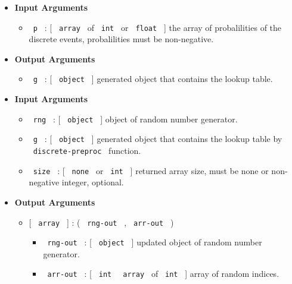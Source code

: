 \begin{itemize}
\item
  \textbf{Input Arguments}

  \begin{itemize}
  \tightlist
  \item
    \texttt{\ p\ } : {[} \texttt{\ array\ } of \texttt{\ int\ } or
    \texttt{\ float\ } {]} the array of probalilities of the discrete
    events, probalilities must be non-negative.
  \end{itemize}
\item
  \textbf{Output Arguments}

  \begin{itemize}
  \tightlist
  \item
    \texttt{\ g\ } : {[} \texttt{\ object\ } {]} generated object that
    contains the lookup table.
  \end{itemize}
\end{itemize}

\begin{Shaded}
\begin{Highlighting}[]
\end{Highlighting}
\end{Shaded}

\begin{itemize}
\item
  \textbf{Input Arguments}

  \begin{itemize}
  \tightlist
  \item
    \texttt{\ rng\ } : {[} \texttt{\ object\ } {]} object of random
    number generator.
  \item
    \texttt{\ g\ } : {[} \texttt{\ object\ } {]} generated object that
    contains the lookup table by \texttt{\ discrete-preproc\ } function.
  \item
    \texttt{\ size\ } : {[} \texttt{\ none\ } or \texttt{\ int\ } {]}
    returned array size, must be none or non-negative integer, optional.
  \end{itemize}
\item
  \textbf{Output Arguments}

  \begin{itemize}
  \tightlist
  \item
    {[} \texttt{\ array\ } {]} : ( \texttt{\ rng-out\ } ,
    \texttt{\ arr-out\ } )

    \begin{itemize}
    \tightlist
    \item
      \texttt{\ rng-out\ } : {[} \texttt{\ object\ } {]} updated object
      of random number generator.
    \item
      \texttt{\ arr-out\ } : {[} \texttt{\ int\ } \textbar{}
      \texttt{\ array\ } of \texttt{\ int\ } {]} array of random
      indices.
    \end{itemize}
  \end{itemize}
\end{itemize}

